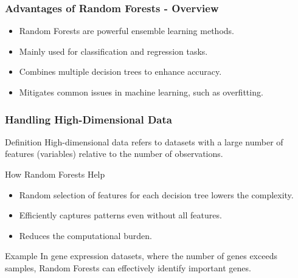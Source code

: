 \documentclass[aspectratio=169]{beamer}
\begin{document}
\begin{frame}[fragile]
  \frametitle{Advantages of Random Forests - Overview}
  \begin{itemize}
    \item Random Forests are powerful ensemble learning methods.
    \item Mainly used for classification and regression tasks.
    \item Combines multiple decision trees to enhance accuracy.
    \item Mitigates common issues in machine learning, such as overfitting.
  \end{itemize}
\end{frame}

\begin{frame}[fragile]
  \frametitle{Handling High-Dimensional Data}
  \begin{block}{Definition}
    High-dimensional data refers to datasets with a large number of features (variables) relative to the number of observations.
  \end{block}
  
  \begin{block}{How Random Forests Help}
    \begin{itemize}
      \item Random selection of features for each decision tree lowers the complexity.
      \item Efficiently captures patterns even without all features.
      \item Reduces the computational burden.
    \end{itemize}
  \end{block}

  \begin{exampleblock}{Example}
    In gene expression datasets, where the number of genes exceeds samples, Random Forests can effectively identify important genes.
  \end{exampleblock}
\end{frame}
\end{document}
